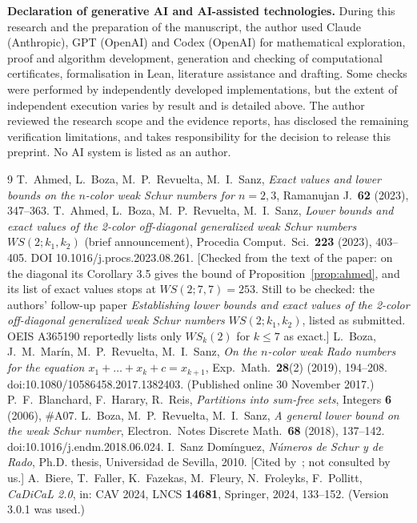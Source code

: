 \documentclass[11pt]{amsart}
\theoremstyle{definition}
\begin{document}
\smallskip\noindent\textbf{Declaration of generative AI and AI-assisted technologies.} During this research and the preparation of the manuscript, the author used Claude (Anthropic), GPT (OpenAI) and Codex (OpenAI) for mathematical exploration, proof and algorithm development, generation and checking of computational certificates, formalisation in Lean, literature assistance and drafting. Some checks were performed by independently developed implementations, but the extent of independent execution varies by result and is detailed above. The author reviewed the research scope and the evidence reports, has disclosed the remaining verification limitations, and takes responsibility for the decision to release this preprint. No AI system is listed as an author.

\begin{thebibliography}{9}
 T.~Ahmed, L.~Boza, M.~P.~Revuelta, M.~I.~Sanz, \emph{Exact values and lower bounds on the $n$-color weak Schur numbers for $n=2,3$}, Ramanujan J.\ \textbf{62} (2023), 347--363.
 T.~Ahmed, L.~Boza, M.~P.~Revuelta, M.~I.~Sanz, \emph{Lower bounds and exact values of the 2-color off-diagonal generalized weak Schur numbers $WS(2;k_1,k_2)$} (brief announcement), Procedia Comput.\ Sci.\ \textbf{223} (2023), 403--405. DOI 10.1016/j.procs.2023.08.261. [Checked from the text of the paper: on the diagonal its Corollary 3.5 gives the bound of Proposition~\ref{prop:ahmed}, and its list of exact values stops at $WS(2;7,7)=253$. Still to be checked: the authors' follow-up paper \emph{Establishing lower bounds and exact values of the 2-color off-diagonal generalized weak Schur numbers $WS(2;k_1,k_2)$}, listed as submitted. OEIS A365190 reportedly lists only $WS_k(2)$ for $k\le7$ as exact.]
 L.~Boza, J.~M.~Mar\'in, M.~P.~Revuelta, M.~I.~Sanz, \emph{On the $n$-color weak Rado numbers for the equation $x_1+\dots+x_k+c=x_{k+1}$}, Exp.\ Math.\ \textbf{28}(2) (2019), 194--208. doi:10.1080/10586458.2017.1382403. (Published online 30 November 2017.)
 P.~F.~Blanchard, F.~Harary, R.~Reis, \emph{Partitions into sum-free sets}, Integers \textbf{6} (2006), \#A07.
 L.~Boza, M.~P.~Revuelta, M.~I.~Sanz, \emph{A general lower bound on the weak Schur number}, Electron.\ Notes Discrete Math.\ \textbf{68} (2018), 137--142. doi:10.1016/j.endm.2018.06.024.
 I.~Sanz Dom\'inguez, \emph{N\'umeros de Schur y de Rado}, Ph.D. thesis, Universidad de Sevilla, 2010. [Cited by~\cite{ABRS}; not consulted by us.]
 A.~Biere, T.~Faller, K.~Fazekas, M.~Fleury, N.~Froleyks, F.~Pollitt, \emph{CaDiCaL 2.0}, in: CAV 2024, LNCS \textbf{14681}, Springer, 2024, 133--152. (Version 3.0.1 was used.)

\end{thebibliography}
\end{document}

